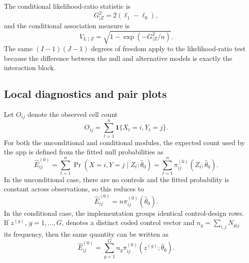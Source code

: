 \documentclass[11pt]{article}
\begin{document}
\begin{appendix}
The conditional likelihood-ratio statistic is
\begin{equation}
G^2_{\mid Z} = 2(\ell_1 - \ell_0),
\label{eq:app-g2-cond}
\end{equation}
and the conditional association measure is
\begin{equation}
V_{L\mid Z} = \sqrt{1 - \exp(-G^2_{\mid Z}/n)}.
\label{eq:app-vlz-cond}
\end{equation}
The same $(I-1)(J-1)$ degrees of freedom apply to the likelihood-ratio test
because the difference between the null and alternative models is exactly the
interaction block.

\subsection{Local diagnostics and pair plots}

Let $O_{ij}$ denote the observed cell count
\begin{equation}
O_{ij} = \sum_{t=1}^{n} \mathbf{1}\{X_t = i, Y_t = j\}.
\label{eq:app-oij}
\end{equation}
For both the unconditional and conditional modules, the expected count used by
the app is defined from the fitted null probabilities as
\begin{equation}
\widehat{E}^{(0)}_{ij}
=
\sum_{t=1}^{n}\Pr(X=i,Y=j \mid Z_t; \widehat{\theta}_0)
=
\sum_{t=1}^{n}\pi^{(0)}_{ij}(Z_t; \widehat{\theta}_0).
\label{eq:app-e0-generic}
\end{equation}
In the unconditional case, there are no controls and the fitted probability is
constant across observations, so this reduces to
\begin{equation}
\widehat{E}^{(0)}_{ij} = n \pi^{(0)}_{ij}(\widehat{\theta}_0).
\label{eq:app-e0-uncond}
\end{equation}
In the conditional case, the implementation groups identical control-design
rows. If $z^{(g)}$, $g = 1, \dots, G$, denotes a distinct coded control vector
and $n_g = \sum_{i,j} N_{gij}$ its frequency, then the same quantity can be
written as
\begin{equation}
\widehat{E}^{(0)}_{ij}
=
\sum_{g=1}^{G} n_g \pi^{(0)}_{ij}(z^{(g)}; \widehat{\theta}_0).
\label{eq:e0group}
\end{equation}


\end{appendix}
\end{document}
